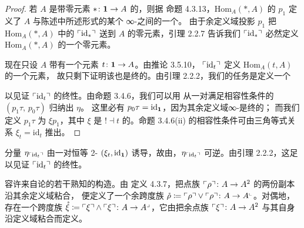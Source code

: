\begin{proof}
若 $A$ 是带零元素 $*\colon\mathbf{1}\to A$ 的\trPointed{}\trInfinityCategory{}，则据%
命题 4.3.13，$\mathrm{Hom}_A(*,A)$ 的 $p_1$ 定义了 $A$ 与陈述中所述形式的某个%
∞-\trCategory{}之间的一个\trEquivalence{}。
由于余定义域投影\trFunctor{} $p_1$ 把 $\mathrm{Hom}_A(*,A)$ 中的\trElement{}
$\ulcorner\mathrm{id}_*\urcorner$ 送到 $A$ 的零元素，引理 2.2.7 告诉我们
$\ulcorner\mathrm{id}_*\urcorner$ 必然定义 $\mathrm{Hom}_A(*,A)$ 的一个零元素。

现在只设 $A$ 带有一个\trTerminal{}元素 $t\colon\mathbf{1}\to A$。由推论 3.5.10，
$\ulcorner\mathrm{id}_t\urcorner$ 定义 $\mathrm{Hom}_A(t,A)$ 的一个\trInitial{}元素，
故只剩下证明该\trElement{}也是终的。由引理 2.2.2，我们的任务是定义一个%
\trNaturalTransformation
\begin{center}
\end{center}
以见证 $\ulcorner\mathrm{id}_t\urcorner$ 的终性。由命题 3.4.6，我们可以用%
\trTwoCellInduction{}从一对满足相容性条件的\trNaturalTransformation{}
$(p_1\tau,\,p_0\tau)$ 归纳出 $\eta$。
这里必有 $p_0\tau=\mathrm{id}_{\mathbf{1}}$，因为其余定义域∞-\trCategory{}是终的；
而我们定义 $p_1\tau$ 为 $\xi p_1$，其中 $\xi$ 是\trAdjunction{} $!\dashv t$
的\trUnit{}。命题 3.4.6(ii) 的相容性条件可由三角等式关系 $\xi_t=\mathrm{id}_t$
推出。
\end{proof}

分量 $\eta_{\ulcorner\mathrm{id}_t\urcorner}$ 由一对恒等 2-\trCell{} $(\xi_t,\mathrm{id}_{\mathbf{1}})$
诱导，故由\trTwoCellConservativity{}，$\eta_{\ulcorner\mathrm{id}_t\urcorner}$ 可逆。由引理
2.2.2，这足以见证 $\ulcorner\mathrm{id}_t\urcorner$ 的终性。

\trPointed{}\trInfinityCategory{}容许来自\trHomotopy{}论的若干熟知的构造。由%
定义 4.3.7，把点族 $\ulcorner\rho\urcorner\colon A\to A^{2}$ 的两份副本沿其余定义域粘合，
便定义了一个余跨度族
$\mathring{\rho}\coloneqq\ulcorner\rho\urcorner\vee\ulcorner\rho\urcorner\colon A\to A^{\llcorner}$。对偶地，
存在一个跨度族
$\mathring{\xi}\coloneqq\ulcorner\xi\urcorner\wedge\ulcorner\xi\urcorner\colon A\to A^{\lrcorner}$，它由把余点族
$\ulcorner\xi\urcorner\colon A\to A^{2}$ 与其自身沿定义域粘合而定义。

